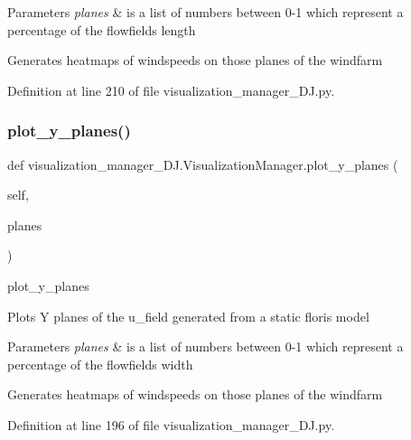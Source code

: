 \begin{DoxyParams}{Parameters}
{\em planes} & is a list of numbers between 0-\/1 which represent a percentage of the flowfield\textquotesingle{}s length\\
\hline
\end{DoxyParams}
Generates heatmaps of windspeeds on those planes of the windfarm 

Definition at line 210 of file visualization\+\_\+manager\+\_\+\+D\+J.\+py.

\mbox{\label{classvisualization__manager___d_j_1_1_visualization_manager_ab0047d9eeda14999bdf8f8de191d9a33}} 
\subsubsection{\texorpdfstring{plot\+\_\+y\+\_\+planes()}{plot\_y\_planes()}}
{\footnotesize\ttfamily def visualization\+\_\+manager\+\_\+\+D\+J.\+Visualization\+Manager.\+plot\+\_\+y\+\_\+planes (\begin{DoxyParamCaption}\item[{}]{self,  }\item[{}]{planes }\end{DoxyParamCaption})}



plot\+\_\+y\+\_\+planes 

Plots Y planes of the u\+\_\+field generated from a static floris model


\begin{DoxyParams}{Parameters}
{\em planes} & is a list of numbers between 0-\/1 which represent a percentage of the flowfield\textquotesingle{}s width\\
\hline
\end{DoxyParams}
Generates heatmaps of windspeeds on those planes of the windfarm 

Definition at line 196 of file visualization\+\_\+manager\+\_\+\+D\+J.\+py.

\mbox{\label{classvisualization__manager___d_j_1_1_visualization_manager_a05c519f1e0389278308ee046d27724cd}} 
